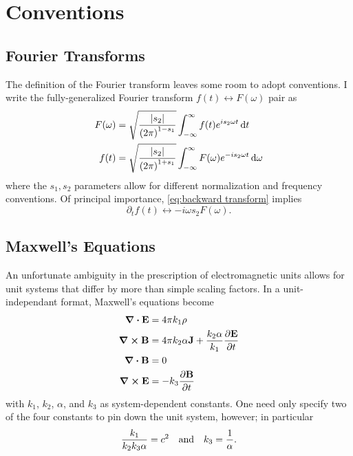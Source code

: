 \chapter{Conventions}

\section{Fourier Transforms\label{sec:general transform}}

The definition of the Fourier transform leaves some room to adopt conventions.
I write the fully-generalized Fourier transform $f(t) \leftrightarrow F(\omega)$ pair as
\begin{subequations}
  \begin{align}
    F(\omega) &= \sqrt{\frac{\abs{s_2}}{\qty(2\pi)^{1-s_1}}} \int_{-\infty}^{\infty} f(t) e^{i s_2 \omega t} \dd{t} \label{eq:forward transform} \\
    f(t) &= \sqrt{\frac{\abs{s_2}}{\qty(2\pi)^{1+s_1}}} \int_{-\infty}^{\infty} F(\omega) e^{- i s_2 \omega t} \dd{\omega} \label{eq:backward transform}
  \end{align}
\end{subequations}
where the $s_1, s_2$ parameters allow for different normalization and frequency conventions. 
Of principal importance, \cref{eq:backward transform} implies
\begin{equation}
  \partial_t f(t) \leftrightarrow -i \omega s_2 F(\omega).
\end{equation}

\section{Maxwell's Equations}

An unfortunate ambiguity in the prescription of electromagnetic units allows for unit systems that differ by more than simple scaling factors.
In a unit-independant format, Maxwell's equations become~\cite{jackson2007classical}
\begin{subequations}
  \begin{align}
    \div{\vb{E}} &= 4 \pi k_1 \rho \label{eq:gauss} \\
    \curl{\vb{B}} &= 4 \pi k_2 \alpha \vb{J} + \frac{k_2 \alpha}{k_1} \pdv{\vb{E}}{t} \label{eq:ampere}\\
    \div{\vb{B}} &= 0 \label{eq:no monopoles} \\
    \curl{\vb{E}} &= - k_3 \pdv{\vb{B}}{t} \label{eq:faraday}
  \end{align}
  \label{eq:time-domain maxwell equations}
\end{subequations}
with $k_1$, $k_2$, $\alpha$, and $k_3$ as system-dependent constants. 
One need only specify two of the four constants to pin down the unit system, however; in particular 
\begin{equation}
  \frac{k_1}{k_2 k_3 \alpha} = c^2 \qq{and} k_3 = \frac{1}{\alpha}.
\end{equation}

